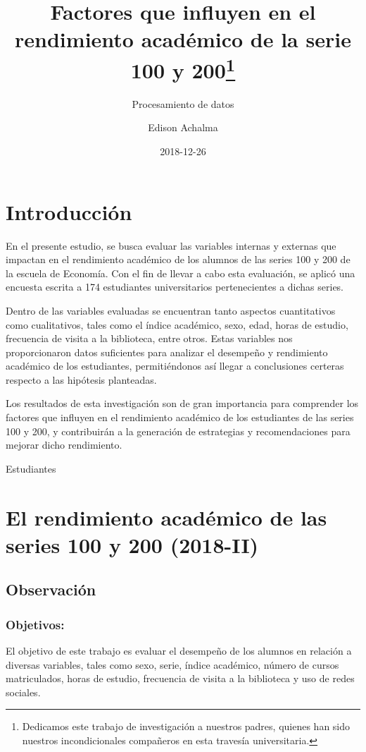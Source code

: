 \documentclass[
  a4paper,
]{article}
\title{Factores que influyen en el rendimiento académico de la serie 100
y 200\thanks{Dedicamos este trabajo de investigación a nuestros padres,
quienes han sido nuestros incondicionales compañeros en esta travesía
universitaria.}}
\subtitle{Procesamiento de datos}
\author{Edison Achalma}
\date{2018-12-26}
\begin{document}
\maketitle

\section{Introducción}\label{introducciuxf3n}

En el presente estudio, se busca evaluar las variables internas y
externas que impactan en el rendimiento académico de los alumnos de las
series 100 y 200 de la escuela de Economía. Con el fin de llevar a cabo
esta evaluación, se aplicó una encuesta escrita a 174 estudiantes
universitarios pertenecientes a dichas series.

Dentro de las variables evaluadas se encuentran tanto aspectos
cuantitativos como cualitativos, tales como el índice académico, sexo,
edad, horas de estudio, frecuencia de visita a la biblioteca, entre
otros. Estas variables nos proporcionaron datos suficientes para
analizar el desempeño y rendimiento académico de los estudiantes,
permitiéndonos así llegar a conclusiones certeras respecto a las
hipótesis planteadas.

Los resultados de esta investigación son de gran importancia para
comprender los factores que influyen en el rendimiento académico de los
estudiantes de las series 100 y 200, y contribuirán a la generación de
estrategias y recomendaciones para mejorar dicho rendimiento.

Estudiantes

\section{El rendimiento académico de las series 100 y 200
(2018-II)}\label{el-rendimiento-acaduxe9mico-de-las-series-100-y-200-2018-ii}

\subsection{Observación}\label{observaciuxf3n}

\subsubsection{Objetivos:}\label{objetivos}

El objetivo de este trabajo es evaluar el desempeño de los alumnos en
relación a diversas variables, tales como sexo, serie, índice académico,
número de cursos matriculados, horas de estudio, frecuencia de visita a
la biblioteca y uso de redes sociales.
\end{document}
